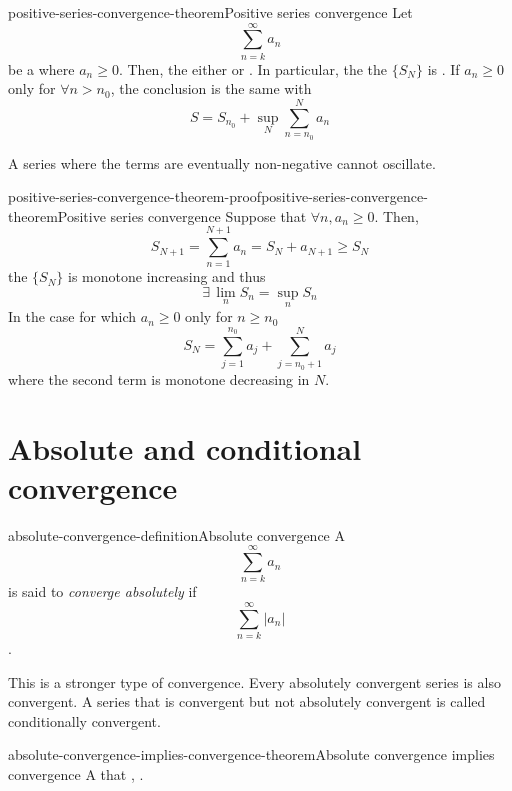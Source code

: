 \documentclass[preview]{standalone}
\begin{document}
\begin{snippettheorem}{positive-series-convergence-theorem}{Positive series convergence}
    Let \[ \sum_{n=k}^\infty a_n \]
    be a \series where \(a_n \geq 0\). Then, the \series either \seriesdiverges
    or \seriesconverges. In particular, the \series \seriesconverges \ifandonlyif the \partialsum
    \sequence \(\{S_N\}\) is .
    If \(a_n \geq 0\) only \eventually for \(\forall n>n_0\),
    the conclusion is the same with
    \[
        S = S_{n_0} + \sup_N
        \sum_{n=n_0}^N a_n
    \]
\end{snippettheorem}

\begin{plainhtml}
    A series where the terms are eventually non-negative cannot oscillate.
\end{plainhtml}

\begin{snippetproof}{positive-series-convergence-theorem-proof}{positive-series-convergence-theorem}{Positive series convergence}
    Suppose that \(\forall n, a_n \geq 0\). Then,
    \[
        S_{N+1} = \sum_{n=1}^{N+1} a_n = S_N + a_{N+1} \geq S_N
    \]
    the \sequence \(\{S_N\}\) is monotone increasing and thus %
    \[ \exists\, \lim_n S_n = \sup_n S_n \]
    In the case for which \(a_n \geq 0\) only for \(n\geq n_0\)
    \[ S_N = \sum_{j=1}^{n_0} a_j + \sum_{j=n_0 + 1}^N a_j \]
    where the second term is monotone decreasing in \(N\).
\end{snippetproof}

\section{Absolute and conditional convergence}

\begin{snippetdefinition}{absolute-convergence-definition}{Absolute convergence}
    A \series \[\sum_{n=k}^\infty a_n\] is said to \emph{converge absolutely} if
    \[\sum_{n=k}^\infty |a_n|\] \seriesconverges.
\end{snippetdefinition}

\begin{plainhtml}
    This is a stronger type of convergence. Every absolutely convergent series is also convergent.
    A series that is convergent but not absolutely convergent is called conditionally convergent.
\end{plainhtml}

\begin{snippettheorem}{absolute-convergence-implies-convergence-theorem}{Absolute convergence implies convergence}
    A \series that \convergesabsolutely, \seriesconverges.
\end{snippettheorem}
\end{document}
